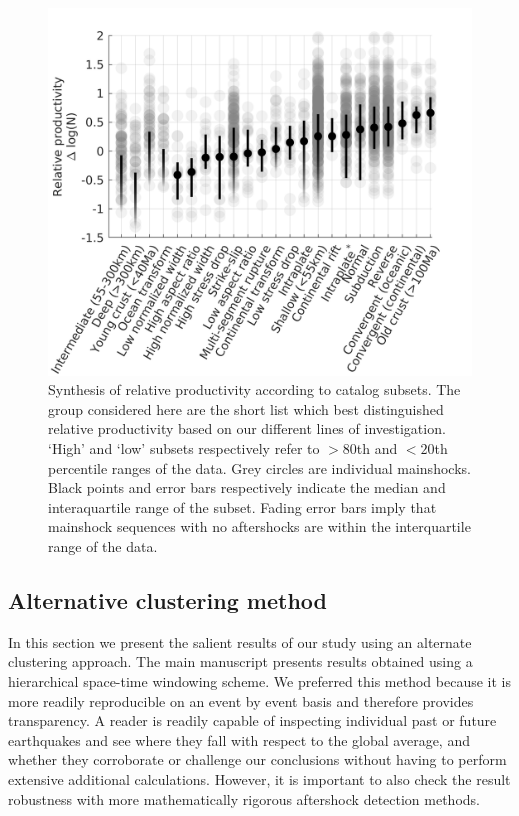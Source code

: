 \documentclass[draft]{agujournal}
\begin{document}
\begin{figure}[H]
\centering

\includegraphics{figures/cal_tech_mw5.png}
\caption{Synthesis of relative productivity according to catalog subsets. The group considered here are the short list which best distinguished relative productivity based on our different lines of investigation. `High' and `low' subsets respectively refer to $>\!\!80$th and $<\!\!20$th percentile ranges of the data. Grey circles are individual mainshocks. Black points and error bars respectively indicate the median and interaquartile range of the subset. Fading error bars imply that mainshock sequences with no aftershocks are within the interquartile range of the data.}
\label{fig:caltech}
\end{figure}   

\newpage
\subsection{Alternative clustering method}\label{sec:alt}

In this section we present the salient results of our study using an alternate clustering approach. The main manuscript presents results obtained using a hierarchical space-time windowing scheme. We preferred this method because it is more readily reproducible on an event by event basis and therefore provides  transparency.  A reader is readily capable of inspecting individual past or future earthquakes and see where they fall with respect to the global average, and whether they corroborate or challenge our conclusions without having to perform extensive additional calculations. However, it is important to also check the result robustness with more mathematically rigorous aftershock detection methods.   
\end{document}
